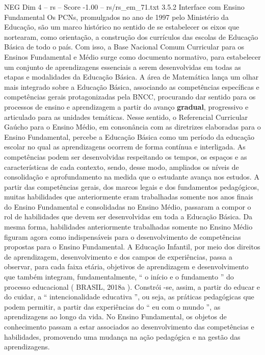 \begin{textsample}{NEG Dim 4 – rs – Score -1.00 – rs/rs\_em\_71.txt}  \label{ex:f4_neg_194}
3.5.2 Interface com Ensino Fundamental Os PCNs, promulgados no ano de 1997 pelo Ministério da Educação, são um marco histórico no sentido de se estabelecer os eixos que nortearam, como orientação, a construção dos currículos das escolas de Educação Básica de todo o país.
Com isso, a Base Nacional Comum Curricular para os Ensinos Fundamental e Médio surge como documento normativo, para estabelecer um conjunto de aprendizagens essenciais a serem desenvolvidas em todas as etapas e modalidades da Educação Básica.
A área de Matemática lança um olhar mais integrado sobre a Educação Básica, associando as competências específicas e competências gerais protagonizadas pela BNCC, procurando dar sentido para os processos de ensino e aprendizagem a partir do avanço \textbf{gradual}, progressivo e articulado para as unidades temáticas.
Nesse sentido, o Referencial Curricular Gaúcho para o Ensino Médio, em consonância com as diretrizes elaboradas para o Ensino Fundamental, percebe a Educação Básica como um período da educação escolar no qual as aprendizagens ocorrem de forma contínua e interligada.
As competências podem ser desenvolvidas respeitando os tempos, os espaços e as características de cada contexto, sendo, desse modo, ampliados os níveis de consolidação e aprofundamento na medida que o estudante avança nos estudos.
A partir das competências gerais, dos marcos legais e dos fundamentos pedagógicos, muitas habilidades que anteriormente eram trabalhadas somente nos anos finais do Ensino Fundamental e consolidadas no Ensino Médio, passaram a compor o rol de habilidades que devem ser desenvolvidas em toda a Educação Básica.
Da mesma forma, habilidades anteriormente trabalhadas somente no Ensino Médio figuram agora como indispensáveis para o desenvolvimento de competências propostas para o Ensino Fundamental.
A Educação Infantil, por meio dos direitos de aprendizagem, desenvolvimento e dos campos de experiências, passa a observar, para cada faixa etária, objetivos de aprendizagem e desenvolvimento que também integram, fundamentalmente, “ o início e o fundamento ” do processo educacional ( BRASIL, 2018a ).
Constrói -se, assim, a partir do educar e do cuidar, a “ intencionalidade educativa ”, ou seja, as práticas pedagógicas que podem permitir, a partir das experiências do “ eu com o mundo ”, as aprendizagens ao longo da vida.
No Ensino Fundamental, os objetos de conhecimento passam a estar associados ao desenvolvimento das competências e habilidades, promovendo uma mudança na ação pedagógica e na gestão das aprendizagens.

\end{textsample}
